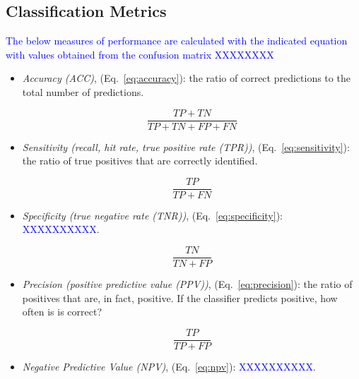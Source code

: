 \subsection{Classification Metrics}

\textcolor{blue}{The below measures of performance are calculated with the indicated equation with values obtained from the confusion matrix XXXXXXXX}

\begin{itemize}
	
\item \textit{Accuracy (ACC)}, (Eq.~\ref{eq:accuracy}): the ratio of correct predictions to the total number of predictions.

\begin{equation}
{\frac{TP+TN}{TP+TN+FP+FN}}
\label{eq:accuracy}
\end{equation}

\item \textit{Sensitivity (recall, hit rate, true positive rate (TPR))}, (Eq.~\ref{eq:sensitivity}): the ratio of true positives that are correctly identified.

\begin{equation}
{\frac{TP}{TP+FN}}
\label{eq:sensitivity}
\end{equation}

\item \textit{Specificity (true negative rate (TNR))}, (Eq.~\ref{eq:specificity}): \textcolor{blue}{XXXXXXXXXX}.

\begin{equation}
{\frac{TN}{TN+FP}}
\label{eq:specificity}
\end{equation}

\item \textit{Precision (positive predictive value (PPV))}, (Eq.~\ref{eq:precision}): the ratio of positives that are, in fact, positive. If the classifier predicts positive, how often is is correct?

\begin{equation}
{\frac{TP}{TP+FP}}
\label{eq:precision}
\end{equation}

\item \textit{Negative Predictive Value (NPV)}, (Eq.~\ref{eq:npv}): \textcolor{blue}{XXXXXXXXXX}.


\end{itemize}
